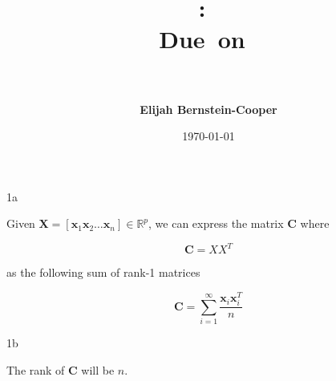 \documentclass{article}
\title{\vspace{0in}
    \textmd{\textbf{\hmwkClass:\ \hmwkTitle}}\\
    \normalsize\vspace{0.1in}\small{Due\ on\ \hmwkDueDate}\\
    \vspace{0.1in}\large{\textit{\hmwkClassInstructor\ \hmwkClassTime}}
    \vspace{0.5in}}
\author{\textbf{Elijah Bernstein-Cooper}}
\date{\today} %
\begin{document}
\maketitle

\begin{homeworkProblem}

    \begin{homeworkSection}{1a}

        Given $\bm{X} = [{\bm x}_1 {\bm x}_2 \dots {\bm x}_n] \in
        \mathbb{R}^p$, we can express the matrix $\bm{C}$ where

        \begin{equation}  
            {\bm C = XX}^T
        \end{equation}

        \noindent as the following sum of rank-1 matrices

        \begin{equation}
            {\bm C} = \sum_{i = 1}^{\infty} \frac{\bm{x}_i \bm{x}_i^T}{n}
        \end{equation}

    \end{homeworkSection}

    \begin{homeworkSection}{1b}
        
        The rank of $\bm{C}$ will be $n$.

    \end{homeworkSection}

\end{homeworkProblem}
\end{document}
